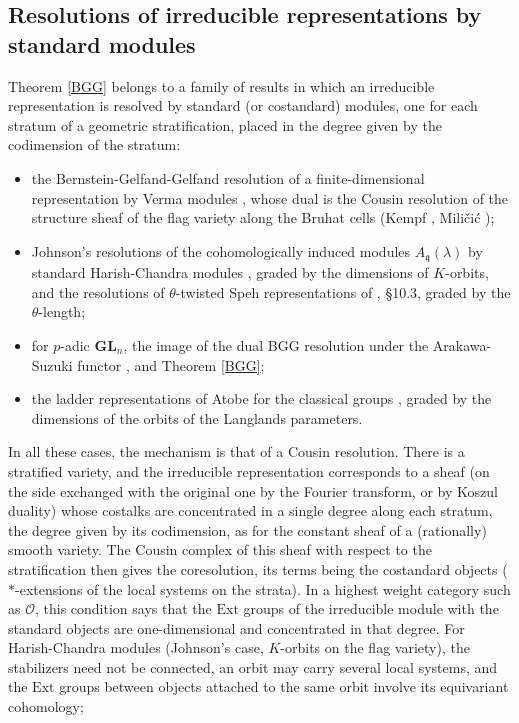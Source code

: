 \documentclass[a4paper,12pt,leqno]{amsart}
\theoremstyle{plain}
\theoremstyle{definition}
\theoremstyle{definition}
\newcommand{\GL}{\mathbf{GL}}
\begin{document}
\subsection*{Resolutions of irreducible representations by standard modules}
Theorem \ref{BGG} belongs to a family of results in which an irreducible representation is resolved
by standard (or costandard) modules, one for each stratum of a geometric stratification, placed in
the degree given by the codimension of the stratum:
\begin{itemize}
\item the Bernstein-Gelfand-Gelfand resolution of a finite-dimensional representation by Verma
modules \cite{BGG75}, whose dual is the Cousin resolution of the structure sheaf of the flag variety
along the Bruhat cells (Kempf \cite{Kem78}, Mili\v{c}i\'c \cite{Mil});
\item Johnson's resolutions of the cohomologically induced modules $A_\mathfrak{q}(\lambda)$ by
standard Harish-Chandra modules \cite{Joh84}, graded by the dimensions of $K$-orbits, and the
resolutions of $\theta$-twisted Speh representations of \cite{AMR18}, \S10.3, graded by the
$\theta$-length;
\item for $p$-adic $\GL_n$, the image of the dual BGG resolution under the Arakawa-Suzuki functor
\cite{BC15}, and Theorem \ref{BGG};
\item the ladder representations of Atobe for the classical groups \cite{Ren26b}, graded by the dimensions of the orbits of the Langlands parameters.
\end{itemize}
In all these cases, the mechanism is that of a Cousin resolution. There is a stratified variety,
and the irreducible representation corresponds to a sheaf (on the side exchanged with the original
one by the Fourier transform, or by Koszul duality) whose costalks are concentrated in a single
degree along each stratum, the degree given by its codimension, as for the constant sheaf of a
(rationally) smooth variety. The Cousin complex of this sheaf with respect to the stratification then
gives the coresolution, its terms being the costandard objects ($*$-extensions of the local systems
on the strata). In a highest weight category such as $\mathcal O$, this condition says that the
$\mathrm{Ext}$ groups of the irreducible module with the standard objects are one-dimensional and
concentrated in that degree. For Harish-Chandra modules (Johnson's case, $K$-orbits on the flag
variety), the stabilizers need not be connected, an orbit may carry several local systems, and the
$\mathrm{Ext}$ groups between objects attached to the same orbit involve its equivariant cohomology;
\end{document}
